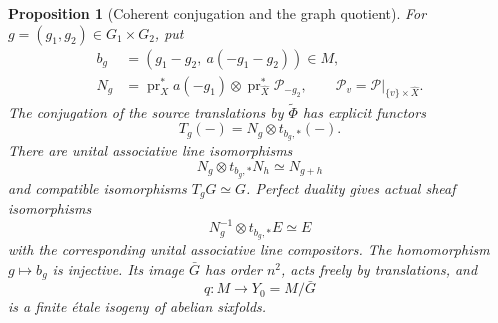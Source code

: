 \documentclass[11pt]{article}
\newtheorem{proposition}[theorem]{Proposition}
\numberwithin{equation}{section}
\begin{document}
\begin{proposition}[Coherent conjugation and the graph quotient]
\label{p3sw:coherent-action}
For \(g=(g_1,g_2)\in G_1\times G_2\), put
\begin{equation}
 \begin{split}
 b_g&=(g_1-g_2,\ a(-g_1-g_2))\in M,\\
 N_g&=\operatorname{pr}_X^*a(-g_1)
       \otimes\operatorname{pr}_{\widehat X}^*\mathcal P_{-g_2},
 \qquad
 \mathcal P_v=\mathcal P|_{\{v\}\times\widehat X}.
 \end{split}
 \label{p3sw:support-conjugated-action}
\end{equation}
The conjugation of the source translations by \(\widetilde\Phi\)
has explicit functors
\begin{equation}
 T_g(-)=N_g\otimes t_{b_g,*}(-).
 \label{p3sw:support-action-functors}
\end{equation}
There are unital associative line isomorphisms
\begin{equation}
 N_g\otimes t_{b_g,*}N_h\simeq N_{g+h}
 \label{p3sw:support-line-compositors}
\end{equation}
and compatible isomorphisms \(T_gG\simeq G\).
Perfect duality gives actual sheaf isomorphisms
\begin{equation}
 N_g^{-1}\otimes t_{b_g,*}E\simeq E
 \label{p3sw:support-dual-action}
\end{equation}
with the corresponding unital associative line compositors.
The homomorphism \(g\mapsto b_g\) is injective.  Its image
\(\bar G\) has order \(n^2\), acts freely by translations, and
\begin{equation}
 q:M\longrightarrow Y_0=M/\bar G
 \label{p3sw:support-quotient}
\end{equation}
is a finite \'etale isogeny of abelian sixfolds.
\end{proposition}
\end{document}
